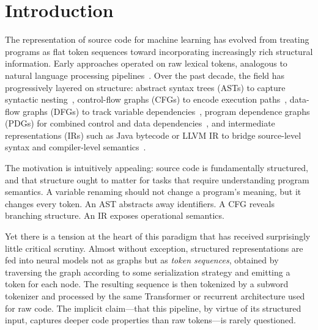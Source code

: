 \documentclass[pdflatex,sn-mathphys,Numbered]{sn-jnl}
\begin{document}

\maketitle

\section{Introduction}\label{sec:intro}

The representation of source code for machine learning has evolved from treating programs as flat token sequences toward incorporating increasingly rich structural information. Early approaches operated on raw lexical tokens, analogous to natural language processing pipelines~\citep{allamanis2018survey}. Over the past decade, the field has progressively layered on structure: abstract syntax trees (ASTs) to capture syntactic nesting~\citep{baxter1998clone,jiang2007deckard}, control-flow graphs (CFGs) to encode execution paths~\citep{allamanis2018graphs}, data-flow graphs (DFGs) to track variable dependencies~\citep{guo2021graphcodebert}, program dependence graphs (PDGs) for combined control and data dependencies~\citep{ferrante1987pdg}, and intermediate representations (IRs) such as Java bytecode or LLVM IR to bridge source-level syntax and compiler-level semantics~\citep{yuan2023clone}.

The motivation is intuitively appealing: source code is fundamentally structured, and that structure ought to matter for tasks that require understanding program semantics. A variable renaming should not change a program's meaning, but it changes every token. An AST abstracts away identifiers. A CFG reveals branching structure. An IR exposes operational semantics.

Yet there is a tension at the heart of this paradigm that has received surprisingly little critical scrutiny. Almost without exception, structured representations are fed into neural models not as graphs but as \emph{token sequences}, obtained by traversing the graph according to some serialization strategy and emitting a token for each node. The resulting sequence is then tokenized by a subword tokenizer and processed by the same Transformer or recurrent architecture used for raw code. The implicit claim---that this pipeline, by virtue of its structured input, captures deeper code properties than raw tokens---is rarely questioned.
\end{document}
